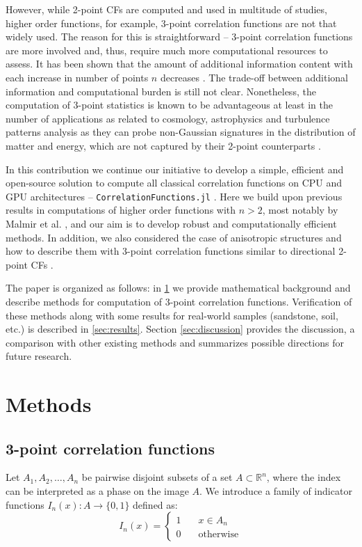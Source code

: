 \documentclass[reprint,amsmath,amssymb,aps,pre,showkeys,showpacs]{revtex4-1}
\newcommand{\code}[1]{\colorbox{light-gray}{\texttt{#1}}}
\begin{document}
However, while 2-point CFs are computed and used in multitude of studies, higher
order functions, for example, 3-point correlation functions are not that widely
used. The reason for this is straightforward -- 3-point correlation functions
are more involved and, thus, require much more computational resources to
assess. It has been shown that the amount of additional information content with
each increase in number of points $n$ decreases \cite{yao1993high,Gommes2}. The
trade-off between additional information and computational burden is still not
clear. Nonetheless, the computation of 3-point statistics is known to be
advantageous at least in the number of applications as related to cosmology,
astrophysics and turbulence patterns analysis as they can probe non-Gaussian
signatures in the distribution of matter and energy, which are not captured by their
2-point counterparts
\cite{TakadaJain,hopkins2013stars,gorbunova2016precessing,yoo2022non}.

In this contribution we continue our initiative to develop a simple, efficient
and open-source solution to compute all classical correlation functions on CPU
and GPU architectures -- \code{CorrelationFunctions.jl} \cite{CFsjlpaper}. Here
we build upon previous results in computations of higher order functions with
$n > 2$, most notably by Malmir et al. \cite{malmir2018}, and our aim is to
develop robust and computationally efficient methods. In addition, we also
considered the case of anisotropic structures and how to describe them with
3-point correlation functions similar to directional 2-point CFs
\cite{10.1063/1.4867611,EPL1}.

The paper is organized as follows: in \cref{sec:methods} we provide
mathematical background and describe methods for computation of 3-point
correlation functions. Verification of these methods along with some results for
real-world samples (sandstone, soil, etc.) is described in
\cref{sec:results}. Section \ref{sec:discussion} provides the discussion, a
comparison with other existing methods and summarizes possible directions for
future research.

\section{Methods}
\label{sec:methods}
\subsection{3-point correlation functions}
Let $A_1, A_2, \dots, A_n$ be pairwise disjoint subsets of a set
$A \subset \mathbb{R}^n$, where the index can be interpreted as a phase on the
image $A$. We introduce a family of indicator functions
$I_n(x) : A \rightarrow \{0,1\}$ defined as:
\begin{equation}
  I_n(x) = \left\{
  \begin{array}{ll}
    1 & \quad x \in A_n \\
    0 & \quad \text{otherwise}
  \end{array}
  \right.
\end{equation}
\end{document}
